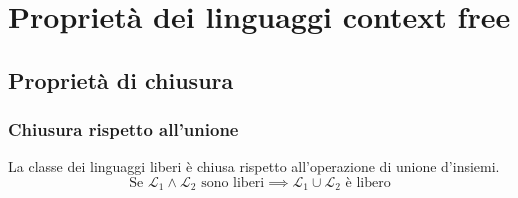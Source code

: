 \documentclass[class=book, crop=false, oneside]{standalone}
\begin{document}
\chapter{Proprietà dei linguaggi context free}

\section{Proprietà di chiusura}

\subsection*{Chiusura rispetto all'unione}
\begin{lemma}
  La classe dei linguaggi liberi è chiusa rispetto all'operazione di unione d'insiemi.
  \begin{equation*}
    \textrm{Se } \mathcal{L}_1 \land \mathcal{L}_2 \textrm{ sono liberi} \implies \mathcal{L}_1 \cup \mathcal{L}_2 \textrm{ è libero}
  \end{equation*}
\end{lemma}
\end{document}
